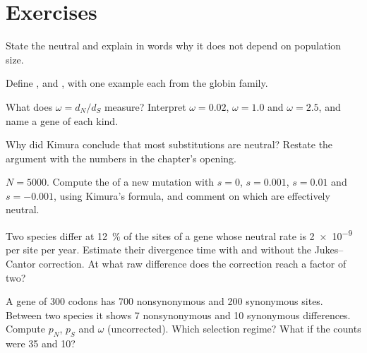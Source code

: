 \section{Exercises}

\begin{exercise}[$\star$]\label{exo:b3:molecular-evolution:1}
State the neutral  and explain in words why it does
not depend on population size.
\end{exercise}

\begin{exercise}[$\star$]\label{exo:b3:molecular-evolution:2}
Define ,  and , with one example each from
the globin family.
\end{exercise}

\begin{exercise}[$\star$]\label{exo:b3:molecular-evolution:3}
What does $\omega = d_{N}/d_{S}$ measure? Interpret $\omega = 0.02$,
$\omega = 1.0$ and $\omega = 2.5$, and name a gene of each kind.
\end{exercise}

\begin{exercise}[$\star$]\label{exo:b3:molecular-evolution:4}
Why did Kimura conclude that most substitutions are neutral? Restate
the argument with the numbers in the chapter's opening.
\end{exercise}

\begin{exercise}[$\star\star$]\label{exo:b3:molecular-evolution:5}
$N = 5000$. Compute the  of a new mutation with $s
= 0$, $s = 0.001$, $s = 0.01$ and $s = -0.001$, using Kimura's formula,
and comment on which are effectively neutral.
\end{exercise}

\begin{exercise}[$\star\star$]\label{exo:b3:molecular-evolution:6}
Two species differ at \qty{12}{\%} of the sites of a gene whose neutral
rate is \qty{2e-9}{} per site per year. Estimate their divergence time
with and without the Jukes--Cantor correction. At what raw difference
does the correction reach a factor of two?
\end{exercise}

\begin{exercise}[$\star\star$]\label{exo:b3:molecular-evolution:7}
A gene of 300 codons has 700 nonsynonymous and 200 synonymous sites.
Between two species it shows 7 nonsynonymous and 10 synonymous
differences. Compute $p_{N}$, $p_{S}$ and $\omega$ (uncorrected). Which
selection regime? What if the counts were 35 and 10?
\end{exercise}

